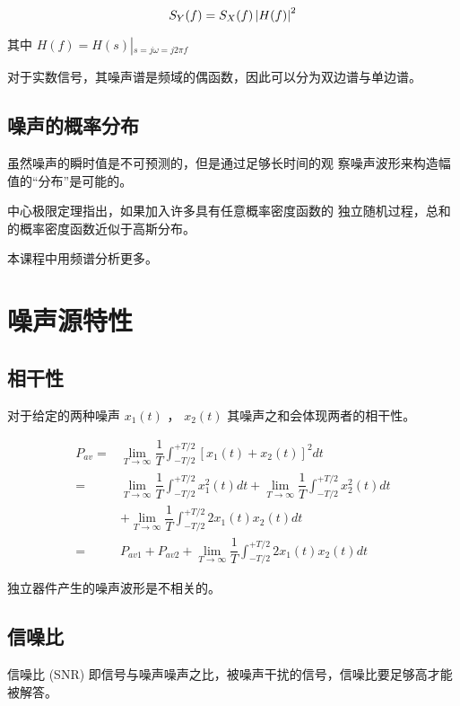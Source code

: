 \documentclass[cn,11pt,chinese,black,simple]{../elegantbook}
\begin{document}
\[S_Y(f) = S_X(f) \left| H(f) \right|^2\] 

其中 \(H(f) = H(s)\left|_{s = j\omega = j 2 \pi f}\right.\)

对于实数信号，其噪声谱是频域的偶函数，因此可以分为双边谱与单边谱。

\subsection{噪声的概率分布}

虽然噪声的瞬时值是不可预测的，但是通过足够长时间的观
察噪声波形来构造幅值的“分布”是可能的。

中心极限定理指出，如果加入许多具有任意概率密度函数的
独立随机过程，总和的概率密度函数近似于高斯分布。

本课程中用频谱分析更多。

\section{噪声源特性}

\subsection{相干性}

对于给定的两种噪声 \(x_1(t)\) ， \(x_2(t)\) 其噪声之和会体现两者的相干性。

\[\begin{aligned}
    P_{a v}=& \lim _{T \rightarrow \infty} \dfrac{1}{T} \int_{-T / 2}^{+T / 2}\left[x_{1}(t)+x_{2}(t)\right]^{2} d t \\
    =& \lim _{T \rightarrow \infty} \dfrac{1}{T} \int_{-T / 2}^{+T / 2} x_{1}^{2}(t) d t+\lim _{T \rightarrow \infty} \dfrac{1}{T} \int_{-T / 2}^{+T / 2} x_{2}^{2}(t) d t \\
    &+\lim _{T \rightarrow \infty} \dfrac{1}{T} \int_{-T / 2}^{+T / 2} 2 x_{1}(t) x_{2}(t) d t \\
    =& P_{a v 1}+P_{a v 2}+\lim _{T \rightarrow \infty} \dfrac{1}{T} \int_{-T / 2}^{+T / 2} 2 x_{1}(t) x_{2}(t) d t
\end{aligned}\]

独立器件产生的噪声波形是不相关的。

\subsection{信噪比}

信噪比 (SNR) 即信号与噪声噪声之比，被噪声干扰的信号，信噪比要足够高才能被解答。
\end{document}
